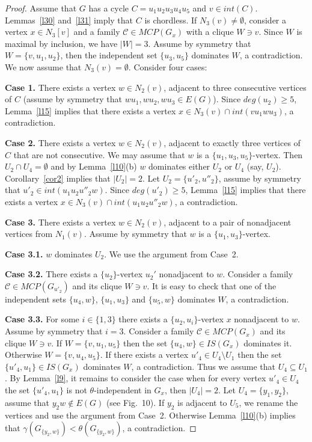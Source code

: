 \documentclass[12pt]{article}
\begin{document}
\begin{proof}
Assume that $G$ has a cycle $C = u_1u_2u_3u_4u_5$ and $v \in int(C)$. Lemmas~\ref{l30} and~\ref{l31} imply that $C$ is chordless. If $N_3(v) \neq \emptyset$, consider a vertex $x \in N_3[v]$ and a family $\mathcal{C} \in MCP(G_x)$ with a clique $W \ni v$. Since $W$ is maximal by inclusion, we have $|W| = 3$. Assume by symmetry that $W = \{v,u_1,u_2\}$, then the independent set $\{u_3,u_5\}$ dominates $W$, a contradiction. We now assume that $N_3(v) = \emptyset$. Consider four cases:

\textbf{Case 1.} There exists a vertex $w \in N_2(v)$, adjacent to three consecutive vertices of $C$ (assume by symmetry that $wu_1,wu_2,wu_3 \in E(G)$). Since $deg(u_2) \geq 5$, Lemma~\ref{l15} implies that there exists a vertex $x \in N_3(v) \cap int(vu_1wu_3)$, a contradiction.

\textbf{Case 2.} There exists a vertex $w \in N_2(v)$, adjacent to exactly three vertices of $C$ that are not consecutive. We may assume that $w$ is a $\{u_1,u_3,u_5\}$-vertex. Then $U_2 \cap U_4 = \emptyset$ and by Lemma~\ref{l10}(b) $w$ dominates either $U_2$ or $U_4$ (say, $U_2$). Corollary~\ref{cor2} implies that $|U_2| = 2$. Let $U_2 = \{u'_2,u''_2\}$, assume by symmetry that $u'_2 \in int(u_1u_2u''_2w)$. Since $deg(u'_2) \geq 5$, Lemma~\ref{l15} implies that there exists a vertex $x \in N_3(v) \cap int(u_1u_2u''_2w)$, a contradiction.

\textbf{Case 3.} There exists a vertex $w \in N_2(v)$, adjacent to a pair of nonadjacent vertices from $N_1(v)$. Assume by symmetry that $w$ is a $\{u_1,u_3\}$-vertex. 

\textbf{Case 3.1.}  $w$ dominates $U_2$. We use the argument from Case~2.

\textbf{Case 3.2.} There exists a $\{u_2\}$-vertex $u_2'$ nonadjacent to $w$. Consider a family $\mathcal{C} \in MCP(G_{u'_2})$ and its clique $W \ni v$.  It is easy to check that one of the independent sets $\{u_4,w\}$, $\{u_1,u_3\}$ and $\{u_5,w\}$ dominates $W$, a contradiction.

\textbf{Case 3.3.} For some $i \in \{1,3\}$ there exists a $\{u_2,u_i\}$-vertex $x$  nonadjacent to $w$. Assume by symmetry that $i = 3$. Consider a family $\mathcal{C} \in MCP(G_{x})$ and its clique $W \ni v$. If $W = \{v,u_1,u_5\}$ then the set $\{u_4,w\} \in IS(G_x)$ dominates it. Otherwise $W = \{v,u_4,u_5\}$. If there exists a vertex $u'_4 \in U_4 \setminus U_1$ then the set $\{u'_4,u_1\} \in IS(G_x)$ dominates $W$, a contradiction. Thus we assume that $U_4 \subseteq U_1$. By Lemma~\ref{l9}, it remains to consider the case when for every vertex $u'_4 \in U_4$ the set $\{u'_4,u_1\}$ is not $\theta$-independent in $G_x$, then $|U_4| = 2$. Let $U_4 = \{y_1,y_2\}$, assume that $y_2w \notin E(G)$ (see Fig.~10). If $y_2$ is adjacent to $U_5$, we rename the vertices and use the argument from Case~2. Otherwise  Lemma~\ref{l10}(b) implies that $\gamma(G_{\{y_2,w\}}) < \theta(G_{\{y_2,w\}})$, a contradiction.


\end{proof}
\end{document}
